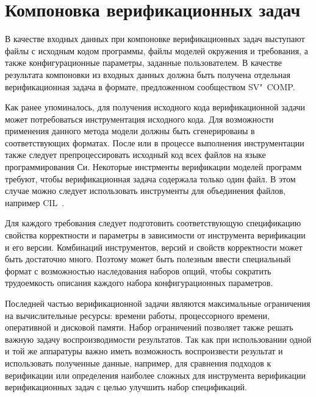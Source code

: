\section{Компоновка верификационных задач}
В качестве входных данных при компоновке верификационных задач выступают файлы с исходным кодом программы, файлы моделей окружения и требования, а также конфигурационные параметры, заданные пользователем.
В качестве результата компоновки из входных данных должна быть получена отдельная верификационная задача в формате, предложенном сообществом SV"~COMP.

Как ранее упоминалось, для получения исходного кода верификационной задачи может потребоваться инструментация исходного кода.
Для возможности применения данного метода модели должны быть сгенерированы в соответствующих форматах.
После или в процессе выполнения инструментации также следует препроцессировать исходный код всех файлов на языке программирования Си.
Некоторые инстрменты верификации моделей программ требуют, чтобы верификационная задача содержала только один файл.
В этом случае можно следует использовать инструменты для объединения файлов, например CIL~\cite{CIL}.

Для каждого требования следует подготовить соответствующую спецификацию свойства корректности и параметры в зависимости от инструмента верификации и его версии.
Комбинаций инструментов, версий и свойств корректности может быть достаточно много.
Поэтому может быть полезным ввести специальный формат с возможностью наследования наборов опций, чтобы сократить трудоемкость описания каждого набора конфигурационных параметров.

Последней частью верификационной задачи являются максимальные ограничения на вычислительные ресурсы: времени работы, процессорного времени, оперативной и дисковой памяти.
Набор ограничений позволяет также решать важную задачу воспроизводимости результатов.
Так как при использовании одной и той же аппаратуры важно иметь возможность воспроизвести результат и использовать полученные данные, например, для сравнения подходов к верификации или определения наиболее сложных для инструмента верификации верификационных задач с целью улучшить набор спецификаций.